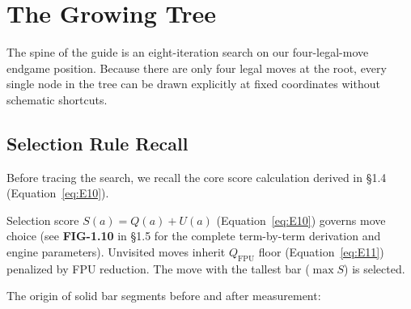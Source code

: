 \chapter{The Growing Tree}
\label{ch:growing_tree}

The spine of the guide is an eight-iteration search on our four-legal-move endgame position. Because there are only four legal moves at the root, every single node in the tree can be drawn explicitly at fixed coordinates without schematic shortcuts.

\section{Selection Rule Recall}

Before tracing the search, we recall the core score calculation derived in §1.4 (Equation~\eqref{eq:E10}).

\begin{established}
Selection score $S(a) = Q(a) + U(a)$ (Equation~\eqref{eq:E10}) governs move choice (see \textbf{FIG-1.10} in §1.5 for the complete term-by-term derivation and engine parameters). Unvisited moves inherit $Q_{\text{FPU}}$ floor (Equation~\eqref{eq:E11}) penalized by FPU reduction. The move with the tallest bar ($\max S$) is selected.
\end{established}

\clearpage

\begin{realdata}
The origin of solid bar segments before and after measurement:
\begin{center}
\begin{minipage}{\linewidth}
\captionsetup{type=figure}
\centering
{}\qquad
{}\\[2ex]
\label{fig:2_b}
\end{minipage}
\end{center}
\end{realdata}

